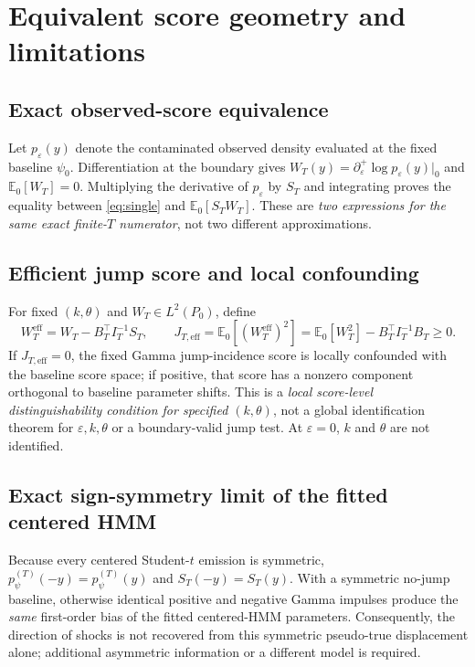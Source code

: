 \documentclass[11pt,a4paper]{article}
\newcommand{\E}{\mathbb E}
\newcommand{\eps}{\varepsilon}
\begin{document}
\section{Equivalent score geometry and limitations}
\subsection{Exact observed-score equivalence}
Let $p_\eps(y)$ denote the contaminated observed density evaluated at the fixed baseline $\psi_0$. Differentiation at the boundary gives $W_T(y)=\partial_\eps^+\log p_\eps(y)|_{0}$ and $\E_0[W_T]=0$. Multiplying the derivative of $p_\eps$ by $S_T$ and integrating proves the equality between \eqref{eq:single} and $\E_0[S_TW_T]$. These are \emph{two expressions for the same exact finite-$T$ numerator}, not two different approximations.

\subsection{Efficient jump score and local confounding}
For fixed $(k,\theta)$ and $W_T\in L^2(P_0)$, define
\begin{equation}
W_T^{\mathrm{eff}}=W_T-B_T^\top I_T^{-1}S_T,\qquad
J_{T,\mathrm{eff}}=\E_0[(W_T^{\mathrm{eff}})^2]
=\E_0[W_T^2]-B_T^\top I_T^{-1}B_T\ge0.\label{eq:efficient}
\end{equation}
If $J_{T,\mathrm{eff}}=0$, the fixed Gamma jump-incidence score is locally confounded with the baseline score space; if positive, that score has a nonzero component orthogonal to baseline parameter shifts. This is a \emph{local score-level distinguishability condition for specified $(k,\theta)$}, not a global identification theorem for $\eps,k,\theta$ or a boundary-valid jump test. At $\eps=0$, $k$ and $\theta$ are not identified.

\subsection{Exact sign-symmetry limit of the fitted centered HMM}
Because every centered Student-$t$ emission is symmetric, $p_\psi^{(T)}(-y)=p_\psi^{(T)}(y)$ and $S_T(-y)=S_T(y)$. With a symmetric no-jump baseline, otherwise identical positive and negative Gamma impulses produce the \emph{same} first-order bias of the fitted centered-HMM parameters. Consequently, the direction of shocks is not recovered from this symmetric pseudo-true displacement alone; additional asymmetric information or a different model is required.
\end{document}
